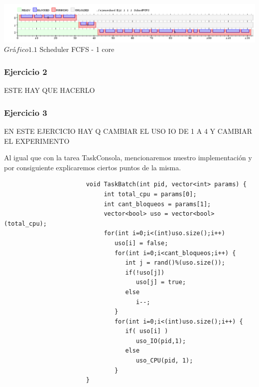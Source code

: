 \vspace*{0.3cm} \vspace*{0.3cm}
  \begin{center}
 \includegraphics[scale=0.5]{./Test/ej1.png}
 { $Gr$\'a$fico 1.1$ Scheduler FCFS - 1 core }
 \end{center}
  \vspace*{0.3cm}



\subsubsection[Resolución Ejercicio 2]{Ejercicio 2}


\indent ESTE HAY QUE HACERLO

\subsubsection[Resolución Ejercicio 3]{Ejercicio 3}

EN ESTE EJERCICIO HAY Q CAMBIAR EL USO IO DE 1 A 4 Y CAMBIAR EL EXPERIMENTO

\indent Al igual que con la tarea TaskConsola, mencionaremos nuestro implementación y por consiguiente  
explicaremos ciertos puntos de la misma.\\
 \begin{verbatim}
                       void TaskBatch(int pid, vector<int> params) {
                            int total_cpu = params[0];
                            int cant_bloqueos = params[1];
                            vector<bool> uso = vector<bool>(total_cpu);
                            for(int i=0;i<(int)uso.size();i++) 
                               uso[i] = false;
                               for(int i=0;i<cant_bloqueos;i++) {
                                  int j = rand()%(uso.size());
                                  if(!uso[j])
                                     uso[j] = true;
                                  else
                                     i--; 
                               }
                               for(int i=0;i<(int)uso.size();i++) {
                                  if( uso[i] )
                                     uso_IO(pid,1); 
                                  else
                                     uso_CPU(pid, 1); 
                               }
                       }
 \end{verbatim}

